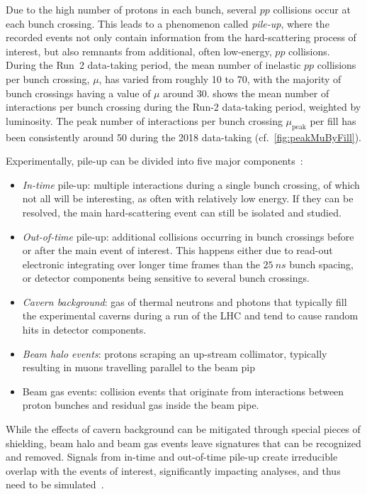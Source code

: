 Due to the high number of protons in each bunch, several $pp$ collisions occur at each bunch crossing. This leads to a phenomenon called \textit{pile-up}, where the recorded events not only contain information from the hard-scattering process of interest, but also remnants from additional, often low-energy, $pp$ collisions. During the Run~2 data-taking period, the mean number of inelastic $pp$ collisions per bunch crossing, $\mu$, has varied from roughly 10 to 70, with the majority of bunch crossings having a value of $\mu$ around 30.  shows the mean number of interactions per bunch crossing during the Run-2 data-taking period, weighted by luminosity. The peak number of interactions per bunch crossing $\mu_\mathrm{peak}$ per fill has been consistently around 50 during the 2018 data-taking (cf.~\cref{fig:peakMuByFill}).

Experimentally, pile-up can be divided into five major components~\cite{Marshall:2014mza}:
\begin{itemize}
	\item \textit{In-time} pile-up: multiple interactions during a single bunch crossing, of which not all will be interesting, as often with relatively low energy. If they can be resolved, the main hard-scattering event can still be isolated and studied.
	\item \textit{Out-of-time} pile-up: additional collisions occurring in bunch crossings before or after the main event of interest. This happens either due to read-out electronic integrating over longer time frames than the $\SI{25}{ns}$ bunch spacing, or detector components being sensitive to several bunch crossings.
	\item \textit{Cavern background}: gas of thermal neutrons and photons that typically fill the experimental caverns during a run of the LHC and tend to cause random hits in detector components.
	\item \textit{Beam halo events}: protons scraping an up-stream collimator, typically resulting in muons travelling parallel to the beam pip
	\item Beam gas events: collision events that originate from interactions between proton bunches and residual gas inside the beam pipe.
\end{itemize}
While the effects of cavern background can be mitigated through special pieces of shielding, beam halo and beam gas events leave signatures that can be recognized and removed. Signals from in-time and out-of-time pile-up create irreducible overlap with the events of interest, significantly impacting analyses, and thus need to be simulated~\cite{Marshall:2014mza}.

